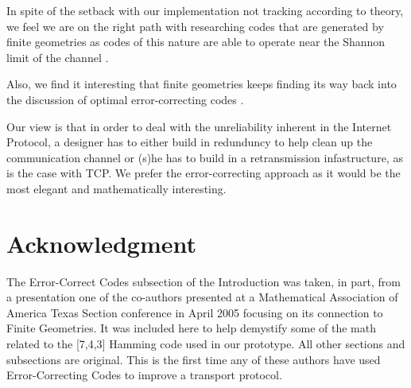 \documentclass[conference]{IEEEtran}
\theoremstyle{definition}
\begin{document}
In spite of the setback with our implementation not tracking
according to theory, we feel we are on the right path with
researching codes that are generated by finite geometries
as codes of this nature are able to operate near the Shannon
limit of the channel \cite{kou2001low}.

Also, we find it interesting that finite geometries keeps
finding its way back into the discussion of optimal error-correcting
codes \cite{assmus1992designs} \cite{kou2001low}.

Our view is that in order to deal with the unreliability inherent
in the Internet Protocol, a designer has to either build
in redunduncy to help clean up the communication channel or
(s)he has to build in a retransmission infastructure, as
is the case with TCP.  We prefer the error-correcting approach
as it would be the most elegant and mathematically interesting.





\section*{Acknowledgment}
The Error-Correct Codes subsection of the Introduction
was taken, in part, from a presentation one of the co-authors
presented at a Mathematical Association of America
Texas Section conference in April 2005 \cite{clanton2005maa}
focusing on its connection to Finite Geometries.
It was included here to help demystify some of the math
related to the [7,4,3] Hamming code used in our prototype.
All other sections and subsections are original.  This is the
first time any of these authors have used Error-Correcting
Codes to improve a transport protocol.






%
%
%
\end{document}
